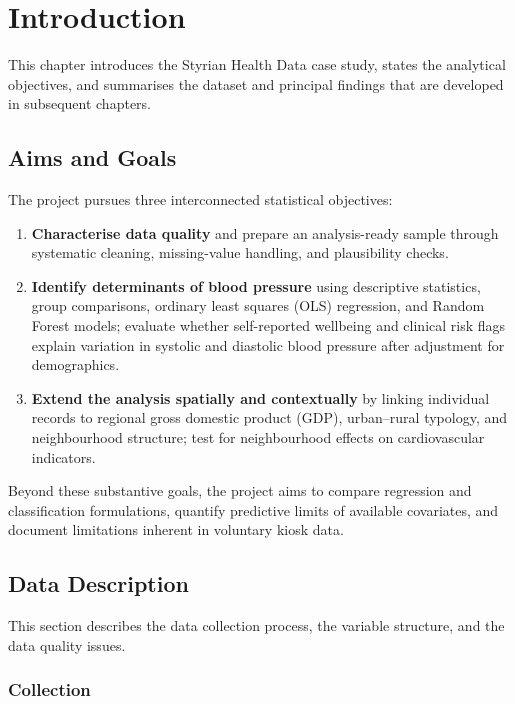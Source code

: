 \chapter{Introduction}
\label{sec:introduction}

This chapter introduces the Styrian Health Data case study, states the analytical objectives, and summarises the dataset and principal findings that are developed in subsequent chapters.

\section{Aims and Goals}
\label{sec:aims}


The project pursues three interconnected statistical objectives:
\begin{enumerate}
    \item \textbf{Characterise data quality} and prepare an analysis-ready sample through systematic cleaning, missing-value handling, and plausibility checks.
    \item \textbf{Identify determinants of blood pressure} using descriptive statistics, group comparisons, ordinary least squares (OLS) regression, and Random Forest models; evaluate whether self-reported wellbeing and clinical risk flags explain variation in systolic and diastolic blood pressure after adjustment for demographics.
    \item \textbf{Extend the analysis spatially and contextually} by linking individual records to regional gross domestic product (GDP), urban--rural typology, and neighbourhood structure; test for neighbourhood effects on cardiovascular indicators.
\end{enumerate}

Beyond these substantive goals, the project aims to compare regression and classification formulations, quantify predictive limits of available covariates, and document limitations inherent in voluntary kiosk data.

\section{Data Description}
\label{sec:data_description}

This section describes the data collection process, the variable structure, and the data quality issues.

\subsection{Collection}

